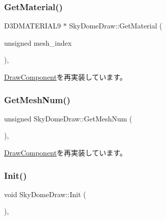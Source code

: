 \mbox{\label{class_sky_dome_draw_a0afc2d0f6236bb3f9d4edea42737dc1c}} 
\subsubsection{\texorpdfstring{Get\+Material()}{GetMaterial()}}
{\footnotesize\ttfamily D3\+D\+M\+A\+T\+E\+R\+I\+A\+L9 $\ast$ Sky\+Dome\+Draw\+::\+Get\+Material (\begin{DoxyParamCaption}\item[{unsigned}]{mesh\+\_\+index }\end{DoxyParamCaption})\hspace{0.3cm}{\ttfamily [override]}, {\ttfamily [virtual]}}



\mbox{\hyperlink{class_draw_component_adae078d5139f691997763bf6cac9e25a}{Draw\+Component}}を再実装しています。

\mbox{\label{class_sky_dome_draw_a3509ab1acfc388e652a8146b8ad027b5}} 
\subsubsection{\texorpdfstring{Get\+Mesh\+Num()}{GetMeshNum()}}
{\footnotesize\ttfamily unsigned Sky\+Dome\+Draw\+::\+Get\+Mesh\+Num (\begin{DoxyParamCaption}{ }\end{DoxyParamCaption})\hspace{0.3cm}{\ttfamily [override]}, {\ttfamily [virtual]}}



\mbox{\hyperlink{class_draw_component_a5f3bbcc8e563b740c0a5535170921c75}{Draw\+Component}}を再実装しています。

\mbox{\label{class_sky_dome_draw_a5b82e8b650a20dbc0b7ed720d1fb7fab}} 
\subsubsection{\texorpdfstring{Init()}{Init()}}
{\footnotesize\ttfamily void Sky\+Dome\+Draw\+::\+Init (\begin{DoxyParamCaption}{ }\end{DoxyParamCaption})\hspace{0.3cm}{\ttfamily [override]}, {\ttfamily [virtual]}}



